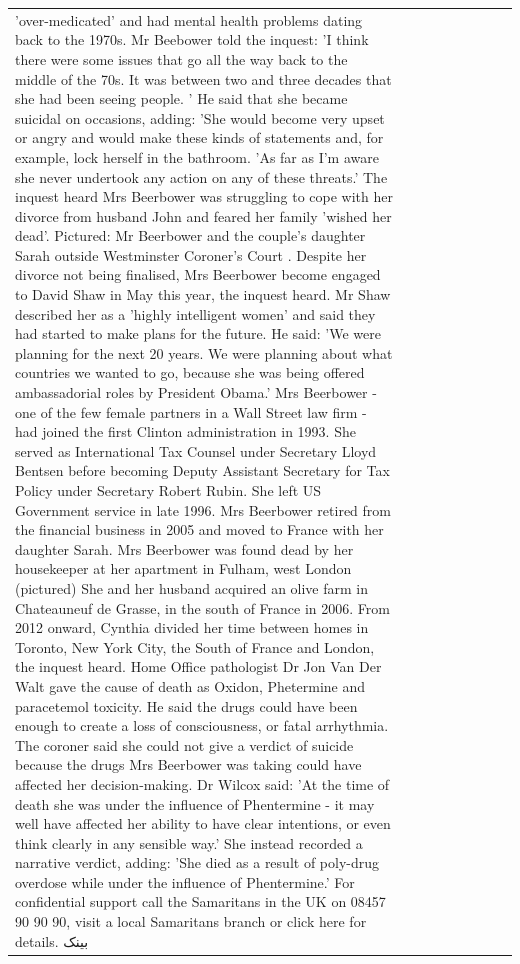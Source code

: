 \begin{table}[H]
\begin{tabular}{lllrlllll}
'over-medicated' and had mental health problems dating back to the 1970s. Mr Beebower told the inquest: 'I think there were some issues that go all the way back to the middle of the 70s. It was between two and three decades that she had been seeing people. ' He said that she became suicidal on occasions, adding: 'She would become very upset or angry and would make these kinds of statements and, for example, lock herself in the bathroom. 'As far as I'm aware she never undertook any action on any of these threats.' The inquest heard Mrs Beerbower was struggling to cope with her divorce from husband John and feared her family 'wished her dead'. Pictured: Mr Beerbower and the couple's daughter Sarah outside Westminster Coroner's Court . Despite her divorce not being finalised, Mrs Beerbower become engaged to David Shaw in May this year, the inquest heard. Mr Shaw described her as a 'highly intelligent women' and said they had started to make plans for the future. He said: 'We were planning for the next 20 years. We were planning about what countries we wanted to go, because she was being offered ambassadorial roles by President Obama.' Mrs Beerbower - one of the few female partners in a Wall Street law firm - had joined the first Clinton administration in 1993. She served as International Tax Counsel under Secretary Lloyd Bentsen before becoming Deputy Assistant Secretary for Tax Policy under Secretary Robert Rubin. She left US Government service in late 1996. Mrs Beerbower retired from the financial business in 2005 and moved to France with her daughter Sarah. Mrs Beerbower was found dead by her housekeeper at her apartment in Fulham, west London (pictured) She and her husband acquired an olive farm in Chateauneuf de Grasse, in the south of France in 2006. From 2012 onward, Cynthia divided her time between homes in Toronto, New York City, the South of France and London, the inquest heard. Home Office pathologist Dr Jon Van Der Walt gave the cause of death as Oxidon, Phetermine and paracetemol toxicity. He said the drugs could have been enough to create a loss of consciousness, or fatal arrhythmia. The coroner said she could not give a verdict of suicide because the drugs Mrs Beerbower was taking could have affected her decision-making. Dr Wilcox said: 'At the time of death she was under the influence of Phentermine - it may well have affected her ability to have clear intentions, or even think clearly in any sensible way.' She instead recorded a narrative verdict, adding: 'She died as a result of poly-drug overdose while under the influence of Phentermine.' For confidential support call the Samaritans in the UK on 08457 90 90 90, visit a local Samaritans branch or click here for details. بینک \\

\end{tabular}
\end{table}
